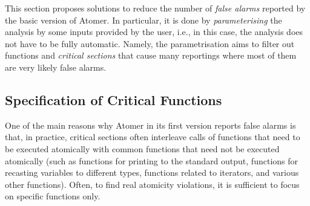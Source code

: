 This section proposes solutions to reduce the number of \emph{false alarms} reported by the basic version of Atomer. In particular, it is done by \emph{parameterising} the analysis by some inputs provided by the user, i.e., in this case, the analysis does not have to be fully automatic. Namely, the parametrisation aims to filter out functions and \emph{critical sections} that cause many reportings where most of them are very likely false alarms.

\subsection{Specification of Critical Functions}

One of the main reasons why Atomer in its first version reports false alarms is that, in practice, critical sections often interleave calls of functions that need to be executed atomically with common functions that need not be executed atomically (such as functions for printing to the standard output, functions for recasting variables to different types, functions related to iterators, and various other  functions). Often, to find real atomicity violations, it is sufficient to focus on specific  functions only.

